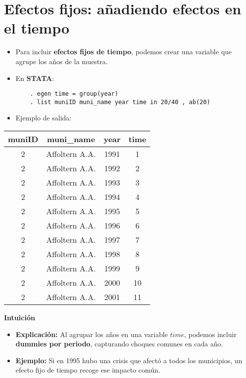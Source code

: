 \documentclass[12pt]{article}
\begin{document}
\section*{\noindent\textbf{Efectos fijos: añadiendo efectos en el tiempo}}

\begin{itemize}
    \item Para incluir \textbf{efectos fijos de tiempo}, podemos crear una variable que agrupe los años de la muestra.
    
    \item En \textbf{STATA}:
    \begin{verbatim}
    . egen time = group(year)
    . list muniID muni_name year time in 20/40 , ab(20)
    \end{verbatim}
    
    \item Ejemplo de salida:
\end{itemize}

\begin{table}[H]
\centering
\begin{tabular}{cccc}
\hline
\textbf{muniID} & \textbf{muni\_name} & \textbf{year} & \textbf{time} \\
\hline
2 & Affoltern A.A. & 1991 & 1 \\
2 & Affoltern A.A. & 1992 & 2 \\
2 & Affoltern A.A. & 1993 & 3 \\
2 & Affoltern A.A. & 1994 & 4 \\
2 & Affoltern A.A. & 1995 & 5 \\
2 & Affoltern A.A. & 1996 & 6 \\
2 & Affoltern A.A. & 1997 & 7 \\
2 & Affoltern A.A. & 1998 & 8 \\
2 & Affoltern A.A. & 1999 & 9 \\
2 & Affoltern A.A. & 2000 & 10 \\
2 & Affoltern A.A. & 2001 & 11 \\
\hline
\end{tabular}
\end{table}

\noindent\textbf{Intuición}
\begin{itemize}
    \item \textbf{Explicación:} Al agrupar los años en una variable $time$, podemos incluir \textbf{dummies por periodo}, capturando choques comunes en cada año.
    \item \textbf{Ejemplo:} Si en 1995 hubo una crisis que afectó a todos los municipios, un efecto fijo de tiempo recoge ese impacto común.
\end{itemize}
\end{document}
